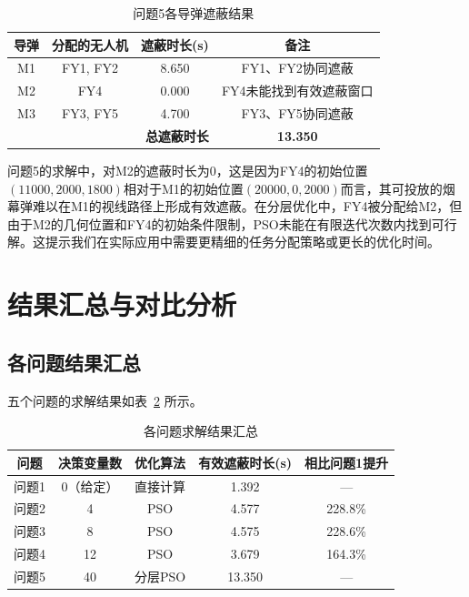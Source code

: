 \documentclass[12pt,a4paper]{article}
\begin{document}
\begin{table}[H]
    \centering
    \caption{问题5各导弹遮蔽结果}
    \label{tab:q5_result}
    \begin{tabular}{cccc}
        \toprule
        导弹 & 分配的无人机 & 遮蔽时长(s) & 备注 \\
        \midrule
        M1 & FY1, FY2 & 8.650 & FY1、FY2协同遮蔽 \\
        M2 & FY4 & 0.000 & FY4未能找到有效遮蔽窗口 \\
        M3 & FY3, FY5 & 4.700 & FY3、FY5协同遮蔽 \\
        \midrule
        \multicolumn{3}{r}{\textbf{总遮蔽时长}} & \textbf{13.350} \\
        \bottomrule
    \end{tabular}
\end{table}

问题5的求解中，对M2的遮蔽时长为0，这是因为FY4的初始位置$(11000, 2000, 1800)$相对于M1的初始位置$(20000, 0, 2000)$而言，其可投放的烟幕弹难以在M1的视线路径上形成有效遮蔽。在分层优化中，FY4被分配给M2，但由于M2的几何位置和FY4的初始条件限制，PSO未能在有限迭代次数内找到可行解。这提示我们在实际应用中需要更精细的任务分配策略或更长的优化时间。


\section{结果汇总与对比分析}

\subsection{各问题结果汇总}

五个问题的求解结果如表~\ref{tab:summary} 所示。

\begin{table}[H]
    \centering
    \caption{各问题求解结果汇总}
    \label{tab:summary}
    \begin{tabular}{ccccc}
        \toprule
        问题 & 决策变量数 & 优化算法 & 有效遮蔽时长(s) & 相比问题1提升 \\
        \midrule
        问题1 & 0（给定） & 直接计算 & 1.392 & --- \\
        问题2 & 4 & PSO & 4.577 & 228.8\% \\
        问题3 & 8 & PSO & 4.575 & 228.6\% \\
        问题4 & 12 & PSO & 3.679 & 164.3\% \\
        问题5 & 40 & 分层PSO & 13.350 & --- \\
        \bottomrule
    \end{tabular}
\end{table}
\end{document}
